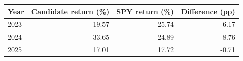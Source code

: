 \begin{tabular}{lrrr}
\toprule
Year & Candidate return (\%) & SPY return (\%) & Difference (pp) \\
\midrule
2023 & 19.57 & 25.74 & -6.17 \\
2024 & 33.65 & 24.89 & 8.76 \\
2025 & 17.01 & 17.72 & -0.71 \\
\bottomrule
\end{tabular}
